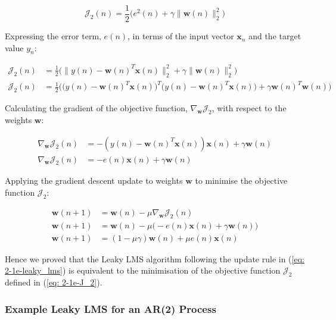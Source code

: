 \documentclass[12pt]{article}
\def\vw{{\bm{w}}}
\begin{document}
			\begin{equation}
			\mathcal{J}_{2}(n) = \frac{1}{2} \bigg( e^{2}(n) + \gamma \| \vw(n) \|_{2}^{2} \bigg)
			\label{eq: 2-1e-J_2}
			\end{equation}
			
			Expressing the error term, $e(n)$, in terms of the input vector $\mathbf{x}_{n}$ and the target value $y_{n}$:
			
			\begin{align}
			\mathcal{J}_{2}(n)  &= \frac{1}{2} \bigg( \| y(n) - \vw(n)^{T} \mathbf{x}(n) \|_{2}^{2} + \gamma \| \vw(n) \|_{2}^{2} \bigg) \\
			\mathcal{J}_{2}(n)  &= \frac{1}{2} \bigg( \big( y(n) - \vw(n)^{T} \mathbf{x}(n))^{T} (y(n) - \vw(n)^{T} \mathbf{x}(n) \big) + \gamma \vw(n)^{T} \vw(n) \bigg)
			\end{align}
			
			Calculating the gradient of the objective function, $\nabla_{\vw} \mathcal{J}_{2}$, with respect to the weights $\vw$:
			
			\begin{align}
			\nabla_{\vw} \mathcal{J}_{2}(n) &= - ( y(n) - \vw(n)^{T} \mathbf{x}(n) ) \mathbf{x}(n) + \gamma \vw(n) \\
			\nabla_{\vw} \mathcal{J}_{2}(n) &= - e(n) \mathbf{x}(n) + \gamma \vw(n)
			\end{align}
			
			Applying the gradient descent update to weights $\vw$ to minimise the objective function $\mathcal{J}_{2}$:
			
			\begin{align}
			\vw(n + 1)  &= \vw(n) - \mu \nabla_{\vw} \mathcal{J}_{2}(n) \\
			\vw(n + 1)  &= \vw(n) - \mu \big( - e(n) \mathbf{x}(n) + \gamma \vw(n) \big) \\
			\vw(n + 1)  &= (1 - \mu \gamma) \vw(n) + \mu e(n) \mathbf{x}(n)
			\label{eq: 2-1e-leaky_lms}
			\end{align}
			
			Hence we proved that the Leaky LMS algorithm following the update rule in (\ref{eq: 2-1e-leaky_lms}) is equivalent to the minimisation of the objective function $\mathcal{J}_{2}$
			defined in (\ref{eq: 2-1e-J_2}).
		\subsubsection{Example Leaky LMS for an AR(2) Process}  
		
\end{document}
